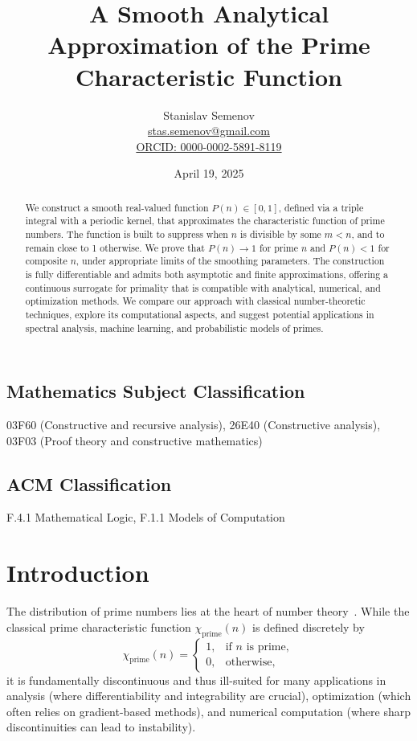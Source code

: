 \documentclass[12pt]{article}
\title{A Smooth Analytical Approximation of the Prime Characteristic Function}
\author{Stanislav Semenov \\
\href{mailto:stas.semenov@gmail.com}{stas.semenov@gmail.com} \\
\href{https://orcid.org/0000-0002-5891-8119}{ORCID: 0000-0002-5891-8119}}
\date{April 19, 2025}
\theoremstyle{definition}
\theoremstyle{plain}
\theoremstyle{remark}
\begin{document}
\maketitle

\begin{abstract}
We construct a smooth real-valued function \( P(n) \in [0,1] \), defined via a triple integral with a periodic kernel, that approximates the characteristic function of prime numbers. The function is built to suppress when \( n \) is divisible by some \( m < n \), and to remain close to 1 otherwise. We prove that \( P(n) \to 1 \) for prime \( n \) and \( P(n) < 1 \) for composite \( n \), under appropriate limits of the smoothing parameters. The construction is fully differentiable and admits both asymptotic and finite approximations, offering a continuous surrogate for primality that is compatible with analytical, numerical, and optimization methods. We compare our approach with classical number-theoretic techniques, explore its computational aspects, and suggest potential applications in spectral analysis, machine learning, and probabilistic models of primes.
\end{abstract}

\subsection*{Mathematics Subject Classification}
03F60 (Constructive and recursive analysis), 26E40 (Constructive analysis), 03F03 (Proof theory and constructive mathematics)

\subsection*{ACM Classification}
F.4.1 Mathematical Logic, F.1.1 Models of Computation

\section*{Introduction}

The distribution of prime numbers lies at the heart of number theory~\cite{hardy1979introduction, titchmarsh1986theory}. While the classical prime characteristic function \( \chi_{\mathrm{prime}}(n) \) is defined discretely by
\[
\chi_{\mathrm{prime}}(n) =
\begin{cases}
1, & \text{if } n \text{ is prime}, \\
0, & \text{otherwise},
\end{cases}
\]
it is fundamentally discontinuous and thus ill-suited for many applications in analysis (where differentiability and integrability are crucial), optimization (which often relies on gradient-based methods), and numerical computation (where sharp discontinuities can lead to instability).
\end{document}
